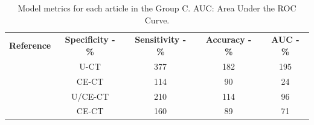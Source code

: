 \documentclass{article}
\begin{document}
\begin{table}[]
    \centering
    \begin{tabular}{ccccc}\toprule
        \multirow{2}{*}{\textbf{Reference}} & \multirow{2}{*}{\textbf{Specificity - \%}} & \multirow{2}{*}{\textbf{Sensitivity - \%}} & \multirow{2}{*}{\textbf{Accuracy - \%}} & \multirow{2}{*}{\textbf{AUC - \%}} \\
        \\\midrule
        \cite{Bi2017}                & U-CT                                     & 377                                                & 182             & 195             \\
        \cite{Bi2022}                  & CE-CT                                    & 114                                                & 90              & 24              \\
        \cite{Kong2022}                       & U/CE-CT                                  & 210                                                & 114             & 96              \\
        \cite{Zheng2020}                 & CE-CT                                    & 160                                                & 89              & 71              \\
        \bottomrule
    \end{tabular}
    \caption{Model metrics for each article in the Group C. AUC: Area Under the ROC Curve.}
    \label{tab:res_C}
\end{table}



\end{document}
